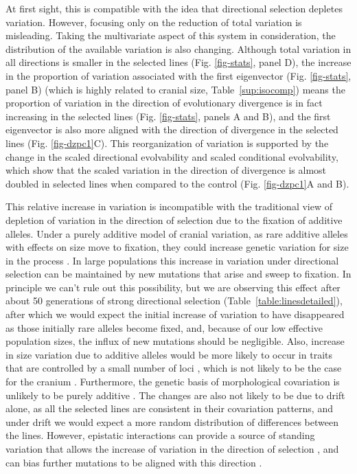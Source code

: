 \begin{refsection}
At first sight, this is compatible with the idea that directional
selection depletes variation. However, focusing only on the reduction of
total variation is misleading. Taking the multivariate aspect of this
system in consideration, the distribution of the available variation is
also changing. Although total variation in all directions is smaller in
the selected lines (Fig. \ref{fig-stats}, panel D), the increase in
the proportion of variation associated with the first eigenvector (Fig.
\ref{fig-stats}, panel B) (which is highly related to cranial size,
Table~\ref{sup:isocomp}) means the proportion of variation in the direction of
evolutionary divergence is in fact increasing in the selected lines
(Fig. \ref{fig-stats}, panels A and B), and the first eigenvector is
also more aligned with the direction of divergence in the selected lines
(Fig. \ref{fig-dzpc1}C). This reorganization of variation is supported
by the change in the scaled directional evolvability and scaled
conditional evolvability, which show that the scaled variation in the
direction of divergence is almost doubled in selected lines when
compared to the control (Fig. \ref{fig-dzpc1}A and B).

This relative increase in variation is incompatible with the traditional view
of depletion of variation in the direction of selection due to the fixation of
additive alleles. Under a purely additive model of cranial variation, as rare
additive alleles with effects on size move to fixation, they could increase
genetic variation for size in the process \parencite{Burger1995-qd}. In large
populations this increase in variation under directional selection can be
maintained by new mutations that arise and sweep to fixation. In principle we
can't rule out this possibility, but we are observing this effect after about
50 generations of strong directional selection
(Table~\ref{table:linesdetailed}), after which we would expect the initial
increase of variation to have disappeared as those initially rare alleles
become fixed, and, because of our low effective population sizes, the influx
of new mutations should be negligible. Also, increase in size variation due to
additive alleles would be more likely to occur in traits that are controlled
by a small number of loci \parencite{Burger1995-qd, Jain2015-fj}, which is not
likely to be the case for the cranium \parencite{Leamy1999-dm, Wolf2005-nr,
Porto2016-qc}. Furthermore, the genetic basis of morphological covariation is
unlikely to be purely additive \parencite{Phillips2001-xb, Whitlock2002-yb}.
The changes are also not likely to be due to drift alone, as all the selected lines
are consistent in their covariation patterns, and under drift we would expect
a more random distribution of differences between the lines. However,
epistatic interactions can provide a source of standing variation that allows
the increase of variation in the direction of selection
\parencite{Cheverud1995-nm, Wagner2007-cx, Pavlicev2011-xm}, and can bias
further mutations to be aligned with this direction \parencite{Jones2007-xe,
Jones2014-wj}.


\end{refsection}
